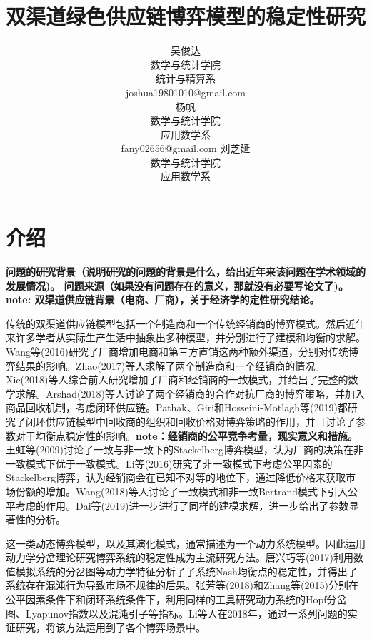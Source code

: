 \documentclass{article}
\title{双渠道绿色供应链博弈模型的稳定性研究}
\author{
    吴俊达\\数学与统计学院\\统计与精算系\\joshua19801010@gmail.com\\
    \And
    杨帆\\数学与统计学院\\应用数学系\\fany02656@gmail.com
    \And
    刘芝延\\数学与统计学院\\应用数学系\\
}
\begin{document}
\maketitle
\begin{abstract}

\end{abstract}
\keywords{}
\section{介绍}
\par \textbf{
    问题的研究背景（说明研究的问题的背景是什么，给出近年来该问题在学术领域的发展情况)。
    问题来源（如果没有问题存在的意义，那就没有必要写论文了)。
    note: 双渠道供应链背景（电商、厂商），关于经济学的定性研究结论。
}
\par 传统的双渠道供应链模型包括一个制造商和一个传统经销商的博弈模式。然后近年来许多学者从实际生产生活中抽象出多种模型，并分别进行了建模和均衡的求解。Wang等(2016)\cite{2016Wang}研究了厂商增加电商和第三方直销这两种额外渠道，分别对传统博弈结果的影响。Zhao(2017)\cite{2017Zhao}等人求解了两个制造商和一个经销商的情况。Xie(2018)\cite{2018Xie}等人综合前人研究增加了厂商和经销商的一致模式，并给出了完整的数学求解。Arshad(2018)\cite{2018Arshad}等人讨论了两个经销商的合作对抗厂商的博弈策略，并加入商品回收机制，考虑闭环供应链。Pathak、Giri和Hosseini-Motlagh等(2019)\cite{2019Pathak}\cite{2019Giri,2019Hosseini-Motlagh}都研究了闭环供应链模型中回收商的组织和回收价格对博弈策略的作用，并且讨论了参数对于均衡点稳定性的影响。\textbf{note：经销商的公平竞争考量，现实意义和措施。}王虹等(2009)\cite{2009Wang}讨论了一致与非一致下的Stackelberg博弈模型，认为厂商的决策在非一致模式下优于一致模式。Li等(2016)\cite{2016Li}研究了非一致模式下考虑公平因素的Stackelberg博弈，认为经销商会在已知不对等的地位下，通过降低价格来获取市场份额的增加。Wang(2018)\cite{2018Wang}等人讨论了一致模式和非一致Bertrand模式下引入公平考虑的作用。Dai等(2019)\cite{2019Dai}进一步进行了同样的建模求解，进一步给出了参数显著性的分析。
\par 这一类动态博弈模型，以及其演化模式，通常描述为一个动力系统模型。因此运用动力学分岔理论研究博弈系统的稳定性成为主流研究方法。唐兴巧等(2017)\cite{2017Tang}利用数值模拟系统的分岔图等动力学特征分析了了系统Nash均衡点的稳定性，并得出了系统存在混沌行为导致市场不规律的后果。张芳等(2018)\cite{2018Zhang}和Zhang等(2015)\cite{2015Zhang}分别在公平因素条件下和闭环系统条件下，利用同样的工具研究动力系统的Hopf分岔图、Lyapunov指数以及混沌引子等指标。Li等人在2018年，通过一系列问题的实证研究，将该方法运用到了各个博弈场景中\cite{2018Huang,2018Qiu-Xiang,2019Qiu-Xiang1,2019Qiu-Xiang2}。
\end{document}
